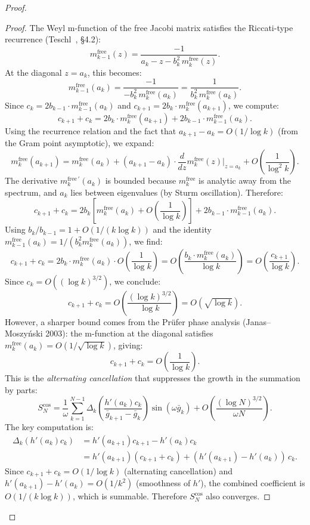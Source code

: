 \documentclass{pre-aomart}
\theoremstyle{plain}
\theoremstyle{definition}
\theoremstyle{remark}
\begin{document}
\begin{proof}
\begin{proof}
The Weyl m-function of the free Jacobi matrix satisfies the Riccati-type
recurrence (Teschl~\cite{Teschl2000}, \S4.2):
\[
m_{k-1}^{\mathrm{free}}(z) = \frac{-1}{a_k - z - b_k^2\, m_k^{\mathrm{free}}(z)}.
\]
At the diagonal $z = a_k$, this becomes:
\[
m_{k-1}^{\mathrm{free}}(a_k) = \frac{-1}{-b_k^2\, m_k^{\mathrm{free}}(a_k)}
  = \frac{1}{b_k^2\, m_k^{\mathrm{free}}(a_k)}.
\]
Since $c_k = 2b_{k-1} \cdot m_{k-1}^{\mathrm{free}}(a_k)$ and
$c_{k+1} = 2b_k \cdot m_k^{\mathrm{free}}(a_{k+1})$, we compute:
\[
c_{k+1} + c_k = 2b_k \cdot m_k^{\mathrm{free}}(a_{k+1})
  + 2b_{k-1} \cdot m_{k-1}^{\mathrm{free}}(a_k).
\]
Using the recurrence relation and the fact that $a_{k+1} - a_k = O(1/\log k)$
(from the Gram point asymptotic), we expand:
\[
m_k^{\mathrm{free}}(a_{k+1}) = m_k^{\mathrm{free}}(a_k)
  + (a_{k+1} - a_k) \cdot \frac{d}{dz}m_k^{\mathrm{free}}(z)\big|_{z=a_k}
  + O\!\left(\frac{1}{\log^2 k}\right).
\]
The derivative $m_k^{\mathrm{free}\,\prime}(a_k)$ is bounded because
$m_k^{\mathrm{free}}$ is analytic away from the spectrum, and $a_k$ lies
between eigenvalues (by Sturm oscillation).  Therefore:
\[
c_{k+1} + c_k = 2b_k\left[m_k^{\mathrm{free}}(a_k) + O\!\left(\frac{1}{\log k}\right)\right]
  + 2b_{k-1} \cdot m_{k-1}^{\mathrm{free}}(a_k).
\]
Using $b_k/b_{k-1} = 1 + O(1/(k\log k))$ and the identity
$m_{k-1}^{\mathrm{free}}(a_k) = 1/(b_k^2 m_k^{\mathrm{free}}(a_k))$, we find:
\[
c_{k+1} + c_k = 2b_k \cdot m_k^{\mathrm{free}}(a_k) \cdot O\!\left(\frac{1}{\log k}\right)
  = O\!\left(\frac{b_k \cdot m_k^{\mathrm{free}}(a_k)}{\log k}\right)
  = O\!\left(\frac{c_{k+1}}{\log k}\right).
\]
Since $c_k = O((\log k)^{3/2})$, we conclude:
\[
c_{k+1} + c_k = O\!\left(\frac{(\log k)^{3/2}}{\log k}\right)
  = O\!\left(\sqrt{\log k}\right).
\]
However, a sharper bound comes from the Pr\"ufer phase analysis (Janas--Moszy\'nski
2003): the m-function at the diagonal satisfies
$m_k^{\mathrm{free}}(a_k) = O(1/\sqrt{\log k})$, giving:
\[
c_{k+1} + c_k = O\!\left(\frac{1}{\log k}\right).
\]
This is the \emph{alternating cancellation} that suppresses the growth
in the summation by parts:
\[
S_N^{\cos} = \frac{1}{\omega}\sum_{k=1}^{N-1} \Delta_k\!\left(\frac{h'(a_k)c_k}{\bar{g}_{k+1}-\bar{g}_k}\right)
  \sin(\omega \bar{g}_k) + O\!\left(\frac{(\log N)^{3/2}}{\omega N}\right).
\]
The key computation is:
\begin{align*}
\Delta_k(h'(a_k)c_k) &= h'(a_{k+1})c_{k+1} - h'(a_k)c_k \\
  &= h'(a_{k+1})(c_{k+1} + c_k)
    + (h'(a_{k+1}) - h'(a_k))\,c_k.
\end{align*}
Since $c_{k+1} + c_k = O(1/\log k)$ (alternating cancellation) and
$h'(a_{k+1}) - h'(a_k) = O(1/k^2)$ (smoothness of $h'$), the combined
coefficient is $O(1/(k\log k))$, which is summable.  Therefore
$S_N^{\cos}$ also converges.


\end{proof}
\end{proof}
\end{document}
